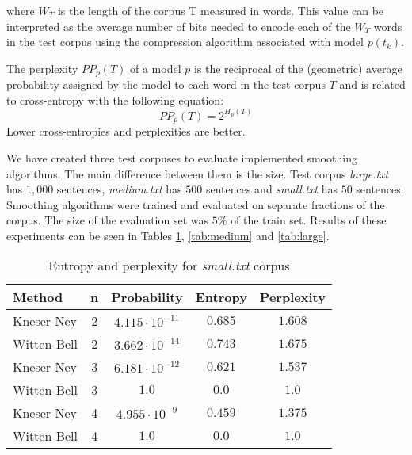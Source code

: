 \documentclass[10pt, a4paper]{article}
\begin{document}
where $W_{T}$ is the length of the corpus T measured in words. This value can be interpreted as the average number of bits needed to encode each of the $W_{T}$ words in the test corpus using the compression algorithm associated with model $p(t_{k})$.

The perplexity $PP_{p}(T)$ of a model $p$ is the reciprocal of the (geometric) average probability assigned by the model to each word in the test corpus $T$ and is related to cross-entropy with the following equation:
\begin{equation}
PP_{p} (T) = 2^{H_{p}(T)}
\end{equation}
Lower cross-entropies and perplexities are better.

We have created three test corpuses to evaluate implemented smoothing algorithms. The main difference between them is the size. Test corpus \textit{large.txt} has $1,000$ sentences, \textit{medium.txt} has $500$ sentences and \textit{small.txt} has $50$ sentences. Smoothing algorithms were trained and evaluated on separate fractions of the corpus. The size of the evaluation set was $5\%$ of the train set. Results of these experiments can be seen in Tables \ref{tab:small}, \ref{tab:medium} and \ref{tab:large}.

\begin{table}[h]
\caption{Entropy and perplexity for \textit{small.txt} corpus}
\label{tab:small}
\begin{center}
\begin{tabular}{lcccc}
\toprule
Method & n & Probability & Entropy & Perplexity \\
\midrule
Kneser-Ney & 2 & $4.115 \cdot 10^{-11}$ & $0.685$ & $1.608$ \\
Witten-Bell & 2 & $3.662 \cdot 10^{-14}$ & $0.743$ & $1.675$ \\

Kneser-Ney & 3 & $6.181 \cdot 10^{-12}$ & $0.621$ & $1.537$ \\
Witten-Bell & 3 & $1.0$ & $0.0$ & $1.0$ \\

Kneser-Ney & 4 & $4.955 \cdot 10^{-9}$ & $0.459$ & $1.375$ \\
Witten-Bell & 4 & $1.0$ & $0.0$ & $1.0$ \\
\bottomrule
\end{tabular}
\end{center}
\end{table}
\end{document}
